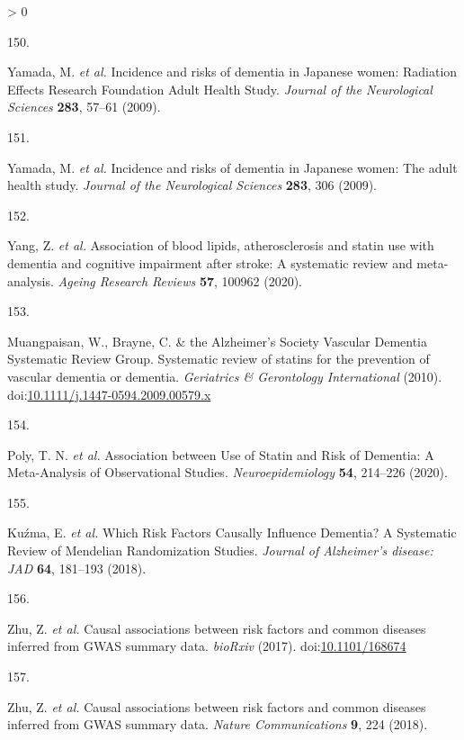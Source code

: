 \documentclass[a4paper, twoside]{templates/ociamthesis}
\newlength{\cslhangindent}
\newlength{\csllabelwidth}
\newenvironment{CSLReferences}[3] %
 {%
  \setlength{\parindent}{0pt}
  \ifodd #1 \everypar{\setlength{\hangindent}{\cslhangindent}}\ignorespaces\fi
  \ifnum #2 > 0
  \setlength{\parskip}{#2\baselineskip}
  \fi
 }%
 {}
\newcommand{\CSLLeftMargin}[1]{\parbox[t]{\maxof{\widthof{#1}}{\csllabelwidth}}{#1}}
\newcommand{\CSLRightInline}[1]{\parbox[t]{\linewidth - \csllabelwidth}{#1}}
\begin{document}
\begin{CSLReferences}{0}{0}
\leavevmode\hypertarget{ref-yamada2009}{}%
\CSLLeftMargin{150. }
\CSLRightInline{Yamada, M. \emph{et al.} Incidence and risks of dementia in {Japanese} women: {Radiation Effects Research Foundation Adult Health Study}. \emph{Journal of the Neurological Sciences} \textbf{283}, 57--61 (2009).}

\leavevmode\hypertarget{ref-yamada2009a}{}%
\CSLLeftMargin{151. }
\CSLRightInline{Yamada, M. \emph{et al.} Incidence and risks of dementia in {Japanese} women: {The} adult health study. \emph{Journal of the Neurological Sciences} \textbf{283}, 306 (2009).}

\leavevmode\hypertarget{ref-yang2020}{}%
\CSLLeftMargin{152. }
\CSLRightInline{Yang, Z. \emph{et al.} Association of blood lipids, atherosclerosis and statin use with dementia and cognitive impairment after stroke: {A} systematic review and meta-analysis. \emph{Ageing Research Reviews} \textbf{57}, 100962 (2020).}

\leavevmode\hypertarget{ref-muangpaisan2010}{}%
\CSLLeftMargin{153. }
\CSLRightInline{Muangpaisan, W., Brayne, C. \& the Alzheimer's Society Vascular Dementia Systematic Review Group. Systematic review of statins for the prevention of vascular dementia or dementia. \emph{Geriatrics \& Gerontology International} (2010). doi:\href{https://doi.org/10.1111/j.1447-0594.2009.00579.x}{10.1111/j.1447-0594.2009.00579.x}}

\leavevmode\hypertarget{ref-poly2020}{}%
\CSLLeftMargin{154. }
\CSLRightInline{Poly, T. N. \emph{et al.} Association between {Use} of {Statin} and {Risk} of {Dementia}: {A Meta}-{Analysis} of {Observational Studies}. \emph{Neuroepidemiology} \textbf{54}, 214--226 (2020).}

\leavevmode\hypertarget{ref-kuzma2018a}{}%
\CSLLeftMargin{155. }
\CSLRightInline{Kuźma, E. \emph{et al.} Which {Risk Factors Causally Influence Dementia}? {A Systematic Review} of {Mendelian Randomization Studies}. \emph{Journal of Alzheimer's disease: JAD} \textbf{64}, 181--193 (2018).}

\leavevmode\hypertarget{ref-zhu2017}{}%
\CSLLeftMargin{156. }
\CSLRightInline{Zhu, Z. \emph{et al.} Causal associations between risk factors and common diseases inferred from {GWAS} summary data. \emph{bioRxiv} (2017). doi:\href{https://doi.org/10.1101/168674}{10.1101/168674}}

\leavevmode\hypertarget{ref-zhu2018}{}%
\CSLLeftMargin{157. }
\CSLRightInline{Zhu, Z. \emph{et al.} Causal associations between risk factors and common diseases inferred from {GWAS} summary data. \emph{Nature Communications} \textbf{9}, 224 (2018).}


\end{CSLReferences}
\end{document}
